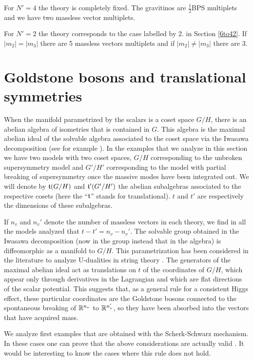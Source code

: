 \documentclass[a4paper,12pt]{article}
\begin{document}
For $N'=4$ the theory is completely fixed. The gravitinos are
$\frac{1}{2}$BPS  multiplets and we have two massless vector
multiplets.

For $N'=2$ the theory corresponds to the case labelled by 2. in
Section \ref{6to42}.  If $|m_2|=|m_3|$ there are 5 massless
vectors multiplets and if $|m_2|\neq|m_3|$  there are  3.


\section{Goldstone bosons and translational symmetries}

When the manifold parametrized by the scalars is a coset space
$G/H$, there is an abelian  algebra of isometries that is
contained in $G$. This algebra is the maximal abelian ideal of the
solvable algebra associated to the coset space via the Iwasawa
decomposition (see for example \cite{he}).  In the examples that
we analyze in this section we have two models with two coset
spaces, $G/H$ corresponding to the unbroken supersymmetry model
and $G'/H'$ corresponding to the model with partial breaking of
supersymmetry once  the massive modes have been integrated out.
We will denote by $\mathfrak{t}(G/H)$ and $\mathfrak{t}'(G'/H')$ the abelian
subalgebras associated to the respective cosets (here the
``$\mathfrak{t}$'' stands for translational). $t$ and $t'$ are respectively
the dimensions of these  subalgebras.

If $n_v$ and $n_v'$ denote the number of massless  vectors in each
theory, we find  in  all the models analyzed that $t-t'=n_v-n_v'$.
The solvable group obtained in the Iwasawa decomposition (now in
the group instead that in the algebra) is diffeomorphic as a
manifold to $G/H$.  This parametrization has been considered in
the literature to analyze U-dualities in string theory
\cite{adfft,lps,cjlp}. The generators of the maximal abelian ideal
act as  translations on $t$ of the coordinates of $G/H$, which
appear only through derivatives in the Lagrangian and
 which are flat directions of  the scalar potential. This suggests that, as a general
rule for a consistent Higgs effect, these particular coordinates
are the Goldstone bosons connected to the spontaneous breaking of
$\mathbb{R}^{n_v}$ to $\mathbb{R}^{n_v'}$, so they have been absorbed into the
vectors that have acquired mass.

We analyze first  examples that are obtained with the
Scherk-Schwarz mechanism. In  these cases one can prove that the
above considerations are actually valid \cite{ss,css,svn}. It
would be interesting to know the cases where this rule does not
hold.
\end{document}
